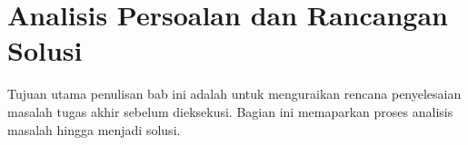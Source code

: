 \chapter{Analisis Persoalan dan Rancangan Solusi}
\label{sec:chapter-3}

Tujuan utama penulisan bab ini adalah untuk menguraikan rencana penyelesaian masalah tugas akhir sebelum dieksekusi. Bagian ini  memaparkan proses analisis masalah hingga menjadi solusi.




